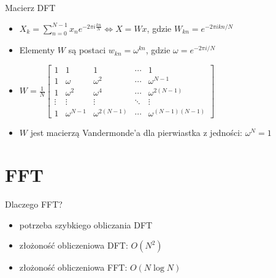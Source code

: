 \documentclass[polish, 12pt, aspectratio=169]{beamer}
\begin{document}
\begin{frame}{Macierz DFT}
    \begin{itemize}[<+->]
        \item \( X_k = \sum_{n=0}^{N-1} x_n e^{-2\pi i \frac{kn}{N}} \Longleftrightarrow X = Wx\), gdzie \( W_{kn} = e^{-2\pi i kn / N} \)
        \item Elementy \(W\) są postaci \( w_{kn} = \omega^{kn} \), gdzie \( \omega = e^{-2\pi i / N} \)
        \item \(W = \frac{1}{N} \begin{bmatrix}
            1 & 1 & 1 & \cdots & 1 \\
            1 & \omega & \omega^2 & \cdots & \omega^{N-1} \\
            1 & \omega^2 & \omega^4 & \cdots & \omega^{2(N-1)} \\
            \vdots & \vdots & \vdots & \ddots & \vdots \\
            1 & \omega^{N-1} & \omega^{2(N-1)} & \cdots & \omega^{(N-1)(N-1)}
        \end{bmatrix}\)
        \item \(W\) jest macierzą Vandermonde'a dla pierwiastka z jedności: \(\omega^N = 1\)
    \end{itemize}
\end{frame}

\section[FFT \\ {\normalsize Fast Fourier Transform}]{FFT}

\begin{frame}{Dlaczego FFT?}
    \begin{itemize}
        \item potrzeba szybkiego obliczania DFT
        \item złożoność obliczeniowa DFT\@: \( O(N^2) \)
        \item<2|alert@2> złożoność obliczeniowa FFT\@: \( O(N \log N) \)
    \end{itemize}
\end{frame}
\end{document}
